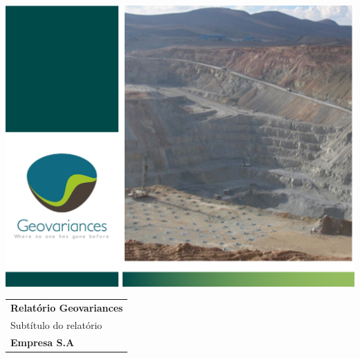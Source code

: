 \begin{titlepage}
		\includegraphics[width=\textwidth]{figuras/capa.png}
	
		\vspace*{10cm}
		
		 \begin{center}
			\begin{tabular}{l}
				\LARGE
				\textbf{Relatório Geovariances}\\

				\vspace{0.5cm}
				\LARGE
				Subtítulo do relatório\\
				
				\vspace{1.5cm}
				
				\large
				\textbf{Empresa S.A}
			\end{tabular}
		\end{center}
		
\end{titlepage}